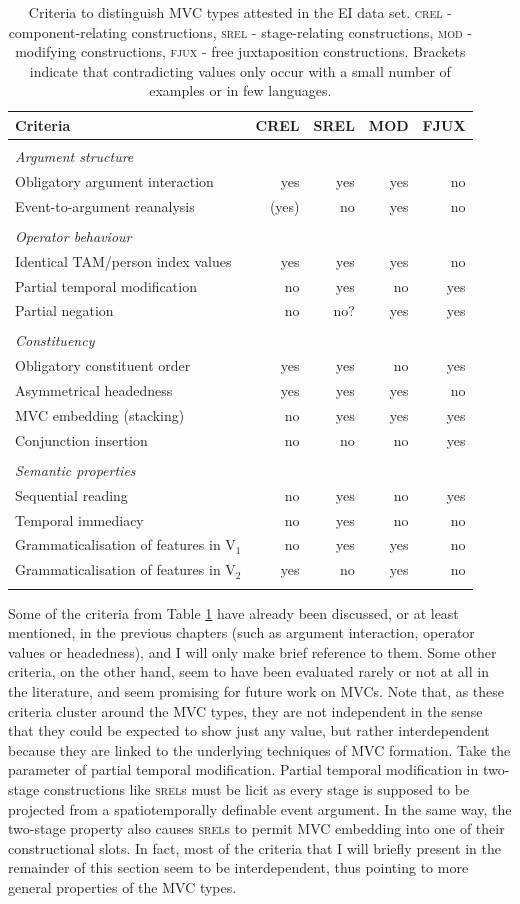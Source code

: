 \begin{table}
\begin{tabular}{lrrrr}
\lsptoprule
Criteria&CREL&SREL&MOD&FJUX\tabularnewline
\midrule
\tabularnewline
\textit{Argument structure}& & & & \tabularnewline
Obligatory argument interaction&yes&yes&yes&no\tabularnewline
Event-to-argument reanalysis&(yes)&no&yes&no\tabularnewline\tabularnewline
\textit{Operator behaviour}& & & & \tabularnewline
Identical TAM/person index values&yes&yes&yes&no\tabularnewline
Partial temporal modification&no&yes&no&yes\tabularnewline
Partial negation&no&no?&yes&yes\tabularnewline\tabularnewline
\textit{Constituency}& & & & \tabularnewline
Obligatory constituent order&yes&yes&no&yes\tabularnewline
Asymmetrical headedness&yes&yes&yes&no\tabularnewline
MVC embedding (stacking)&no&yes&yes&yes\tabularnewline
Conjunction insertion&no&no&no&yes\tabularnewline\tabularnewline
\textit{Semantic properties}& & & & \tabularnewline
Sequential reading&no&yes&no&yes\tabularnewline
Temporal immediacy&no&yes&no&no\tabularnewline
Grammaticalisation of features in V$_1$&no&yes&yes&no\tabularnewline
Grammaticalisation of features in V$_2$&yes&no&yes&no\tabularnewline
\lspbottomrule
\end{tabular}
\caption[Criteria to distinguish MVC types]{Criteria to distinguish MVC types attested in the EI data set. \textsc{crel} - component-relating constructions, \textsc{srel} - stage-relating constructions, \textsc{mod} - modifying constructions, \textsc{fjux} - free juxtaposition constructions. Brackets indicate that contradicting values only occur with a small number of examples or in few languages.}
\label{table:criteriaconstruction}
\end{table}

Some of the criteria from Table \ref{table:criteriaconstruction} have already been discussed, or at least mentioned, in the previous chapters (such as argument interaction, operator values or headedness), and I will only make brief reference to them. Some other criteria, on the other hand, seem to have been evaluated rarely or not at all in the literature, and seem promising for future work on MVCs. Note that, as these criteria cluster around the MVC types, they are not independent in the sense that they could be expected to show just any value, but rather interdependent because they are linked to the underlying techniques of MVC formation. Take the parameter of partial temporal modification. Partial temporal modification in two-stage constructions like \textsc{srel}s must be licit as every stage is supposed to be projected from a spatiotemporally definable event argument. In the same way, the two-stage property also causes \textsc{srel}s to permit MVC embedding into one of their constructional slots. In fact, most of the criteria that I will briefly present in the remainder of this section seem to be interdependent, thus pointing to more general properties of the MVC types.


